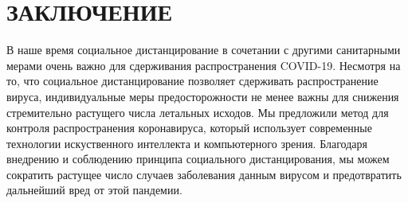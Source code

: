 \chapter*{ЗАКЛЮЧЕНИЕ}    

В наше время социальное дистанцирование в сочетании с другими санитарными мерами очень важно для сдерживания распространения \mbox{COVID-19}. Несмотря на то, что социальное дистанцирование позволяет сдерживать распространение вируса, индивидуальные меры предосторожности не менее важны для снижения стремительно растущего числа летальных исходов. Мы предложили метод для контроля распространения коронавируса, который использует современные технологии искуственного интеллекта и компьютерного зрения. Благодаря внедрению и соблюдению принципа социального дистанцирования, мы можем сократить растущее число случаев заболевания данным вирусом и предотвратить дальнейший вред от этой пандемии.

\newpage
